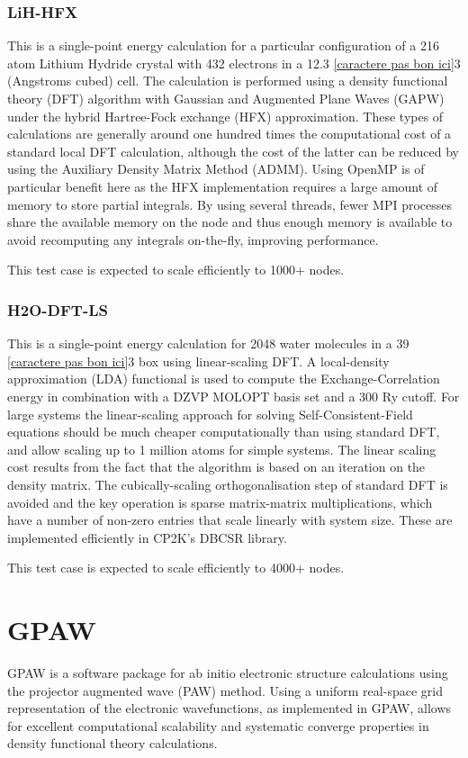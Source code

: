 \subsubsection{LiH-HFX}
This is a single-point energy calculation for a particular configuration of a 216 atom Lithium Hydride crystal with 432 electrons in a 12.3 \ref{caractere pas bon ici}3 (Angstroms cubed) cell. The calculation is performed using a density functional theory (DFT) algorithm with Gaussian and Augmented Plane Waves (GAPW) under the hybrid Hartree-Fock exchange (HFX) approximation. These types of calculations are generally around one hundred times the computational cost of a standard local DFT calculation, although the cost of the latter can be reduced by using the Auxiliary Density Matrix Method (ADMM). Using OpenMP is of particular benefit here as the HFX implementation requires a large amount of memory to store partial integrals. By using several threads, fewer MPI processes share the available memory on the node and thus enough memory is available to avoid recomputing any integrals on-the-fly, improving performance.

This test case is expected to scale efficiently to 1000+ nodes.

\subsubsection{H2O-DFT-LS}
This is a single-point energy calculation for 2048 water molecules in a 39 \ref{caractere pas bon ici}3 box using linear-scaling DFT. A local-density approximation (LDA) functional is used to compute the Exchange-Correlation energy in combination with a DZVP MOLOPT basis set and a 300 Ry cutoff. For large systems the linear-scaling approach for solving Self-Consistent-Field equations should be much cheaper computationally than using standard DFT, and allow scaling up to 1 million atoms for simple systems. The linear scaling cost results from the fact that the algorithm is based on an iteration on the density matrix. The cubically-scaling orthogonalisation step of standard DFT is avoided and the key operation is sparse matrix-matrix multiplications, which have a number of non-zero entries that scale linearly with system size. These are implemented efficiently in CP2K's DBCSR library.

This test case is expected to scale efficiently to 4000+ nodes.

\section{GPAW}
GPAW is a software package for ab initio electronic structure calculations using the projector augmented wave (PAW) method. Using a uniform real-space grid representation of the electronic wavefunctions, as implemented in GPAW, allows for excellent computational scalability and systematic converge properties in density functional theory calculations.

